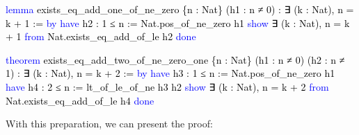 \documentclass[
  letterpaper,
  DIV=11,
  numbers=noendperiod]{scrreprt}
\newenvironment{Shaded}{\begin{snugshade}}{\end{snugshade}}
\newcommand{\KeywordTok}[1]{\textcolor[rgb]{0.00,0.23,0.31}{#1}}
\newcommand{\NormalTok}[1]{\textcolor[rgb]{0.00,0.23,0.31}{#1}}
\renewcommand{\NormalTok}[1]{\textcolor[HTML]{000000}{#1}}
\renewcommand{\KeywordTok}[1]{\textcolor[HTML]{0000FF}{#1}}
\theoremstyle{remark}
\begin{document}
\begin{Shaded}
\begin{Highlighting}[]
\KeywordTok{lemma}\NormalTok{ exists\_eq\_add\_one\_of\_ne\_zero \{n : Nat\}}
\NormalTok{    (h1 : n ≠ 0) : ∃ (k : Nat), n = k + 1 := }\KeywordTok{by}
  \KeywordTok{have}\NormalTok{ h2 : 1 ≤ n := Nat.pos\_of\_ne\_zero h1}
  \KeywordTok{show}\NormalTok{ ∃ (k : Nat), n = k + 1 }\KeywordTok{from}\NormalTok{ Nat.exists\_eq\_add\_of\_le\textquotesingle{} h2}
  \KeywordTok{done}

\KeywordTok{theorem}\NormalTok{ exists\_eq\_add\_two\_of\_ne\_zero\_one \{n : Nat\}}
\NormalTok{    (h1 : n ≠ 0) (h2 : n ≠ 1) : ∃ (k : Nat), n = k + 2 := }\KeywordTok{by}
  \KeywordTok{have}\NormalTok{ h3 : 1 ≤ n := Nat.pos\_of\_ne\_zero h1}
  \KeywordTok{have}\NormalTok{ h4 : 2 ≤ n := lt\_of\_le\_of\_ne\textquotesingle{} h3 h2}
  \KeywordTok{show}\NormalTok{ ∃ (k : Nat), n = k + 2 }\KeywordTok{from}\NormalTok{ Nat.exists\_eq\_add\_of\_le\textquotesingle{} h4}
  \KeywordTok{done}
\end{Highlighting}
\end{Shaded}

With this preparation, we can present the proof:
\end{document}
